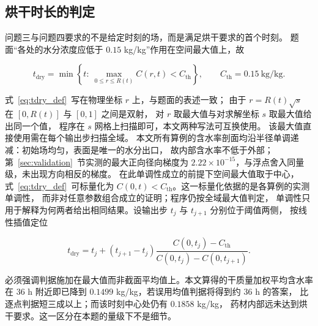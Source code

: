 \subsection{烘干时长的判定}

问题三与问题四要求的不是给定时刻的场，而是满足烘干要求的首个时刻。
题面“各处的水分浓度应低于 $0.15$ kg/kg”作用在空间最大值上，故

\begin{equation}
t_{\mathrm{dry}}=\min\left\{t:\ \max_{0\le r\le R(t)}C(r,t)<C_{\mathrm{th}}\right\},
\qquad C_{\mathrm{th}}=0.15~\text{kg/kg}.
\label{eq:tdry_def}
\end{equation}

式~\eqref{eq:tdry_def}~写在物理坐标 $r$ 上，与题面的表述一致；
由于 $r=R(t)\sqrt{s}$ 在 $[0,R(t)]$ 与 $[0,1]$ 之间是双射，
对 $r$ 取最大值与对求解坐标 $s$ 取最大值给出同一个值，
程序在 $s$ 网格上扫描即可，本文两种写法可互换使用。
该最大值直接使用需在每个输出步扫描全域。
本文所有算例的含水率剖面均沿半径单调递减：初始场均匀，表面是唯一的水分出口，
故内部含水率不低于外部；第~\ref{sec:validation}~节实测的最大正向径向梯度为
$2.22\times10^{-15}$，与浮点舍入同量级，未出现方向相反的梯度。
在此单调性成立的前提下空间最大值取于中心，式~\eqref{eq:tdry_def}~可标量化为
$C(0,t)<C_{\mathrm{th}}$。这一标量化依据的是各算例的实测单调性，
而非对任意参数组合成立的证明；程序仍按全域最大值判定，
单调性只用于解释为何两者给出相同结果。设输出步 $t_j$ 与 $t_{j+1}$ 分别位于阈值两侧，
按线性插值定位

\begin{equation}
t_{\mathrm{dry}}=t_j+\left(t_{j+1}-t_j\right)
\frac{C(0,t_j)-C_{\mathrm{th}}}{C(0,t_j)-C(0,t_{j+1})}.
\label{eq:tdry_interp}
\end{equation}

必须强调判据施加在最大值而非截面平均值上。本文算得的干质量加权平均含水率
在 $36$ h 附近即已降到 $0.1499$ kg/kg，若误用均值判据将得到约 $36$ h 的答案，
比逐点判据短三成以上；而该时刻中心处仍有 $0.1858$ kg/kg，
药材内部远未达到烘干要求。这一区分在本题的量级下不是细节。
